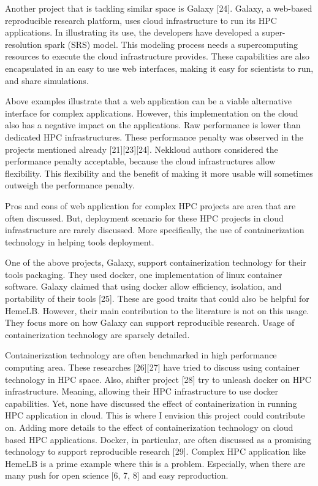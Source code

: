 \documentclass[]{article}
\begin{document}
Another project that is tackling similar space is Galaxy {[}24{]}.
Galaxy, a web-based reproducible research platform, uses cloud
infrastructure to run its HPC applications. In illustrating its use, the
developers have developed a super-resolution spark (SRS) model. This
modeling process needs a supercomputing resources to execute the cloud
infrastructure provides. These capabilities are also encapsulated in an
easy to use web interfaces, making it easy for scientists to run, and
share simulations.

Above examples illustrate that a web application can be a viable
alternative interface for complex applications. However, this
implementation on the cloud also has a negative impact on the
applications. Raw performance is lower than dedicated HPC
infrastructures. These performance penalty was observed in the projects
mentioned already {[}21{]}{[}23{]}{[}24{]}. Nekkloud authors considered
the performance penalty acceptable, because the cloud infrastructures
allow flexibility. This flexibility and the benefit of making it more
usable will sometimes outweigh the performance penalty.

Pros and cons of web application for complex HPC projects are area that
are often discussed. But, deployment scenario for these HPC projects in
cloud infrastructure are rarely discussed. More specifically, the use of
containerization technology in helping tools deployment.

One of the above projects, Galaxy, support containerization technology
for their tools packaging. They used docker, one implementation of linux
container software. Galaxy claimed that using docker allow efficiency,
isolation, and portability of their tools {[}25{]}. These are good
traits that could also be helpful for HemeLB. However, their main
contribution to the literature is not on this usage. They focus more on
how Galaxy can support reproducible research. Usage of containerization
technology are sparsely detailed.

Containerization technology are often benchmarked in high performance
computing area. These researches {[}26{]}{[}27{]} have tried to discuss
using container technology in HPC space. Also, shifter project {[}28{]}
try to unleash docker on HPC infrastructure. Meaning, allowing their HPC
infrastructure to use docker capabilities. Yet, none have discussed the
effect of containerization in running HPC application in cloud. This is
where I envision this project could contribute on. Adding more details
to the effect of containerization technology on cloud based HPC
applications. Docker, in particular, are often discussed as a promising
technology to support reproducible research {[}29{]}. Complex HPC
application like HemeLB is a prime example where this is a problem.
Especially, when there are many push for open science {[}6, 7, 8{]} and
easy reproduction.
\end{document}

